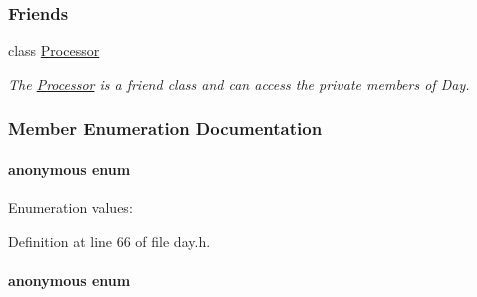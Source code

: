 \subsubsection*{Friends}
\begin{CompactItemize}
\item 
class \hyperlink{classDay_Dayl0}{Processor}
\begin{CompactList}\small\item\em The \hyperlink{classProcessor}{Processor} is a friend class and can access the private members of Day.\item\end{CompactList}\end{CompactItemize}


\subsubsection{Member Enumeration Documentation}
\hypertarget{classDay_Dayu3}{
\paragraph["@4]{\setlength{\rightskip}{0pt plus 5cm}anonymous enum}\hfill}
\label{classDay_Dayu3}


\begin{Desc}
\item[Enumeration values: ]\par
\begin{description}
\item[{\em 
\hypertarget{classDay_Dayu3Dayu0}{
{\em default\_\-avg\_\-threshold}}
\label{classDay_Dayu3Dayu0}
}]\end{description}
\end{Desc}



Definition at line 66 of file day.h.\hypertarget{classDay_Dayu4}{
\paragraph["@5]{\setlength{\rightskip}{0pt plus 5cm}anonymous enum}\hfill}
\label{classDay_Dayu4}


